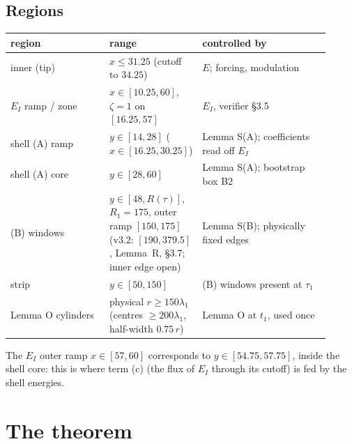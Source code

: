 \documentclass[11pt]{article}
\theoremstyle{definition}
\theoremstyle{remark}
\begin{document}
\subsection{Regions}
\begin{center}\small
\begin{tabular}{@{}p{0.31\linewidth}p{0.20\linewidth}p{0.40\linewidth}@{}}
\toprule region & range & controlled by\\\midrule
inner (tip) & $x\le31.25$ (cutoff to $34.25$) & $E$; forcing, modulation\\
$E_I$ ramp / zone & $x\in[10.25,60]$, $\zeta=1$ on $[16.25,57]$ & $E_I$, verifier \S3.5\\
shell (A) ramp & $y\in[14,28]$ ($x\in[16.25,30.25]$) & Lemma S(A); coefficients read off $E_I$\\
shell (A) core & $y\in[28,60]$ & Lemma S(A); bootstrap box B2\\
(B) windows & $y\in[48,R(\tau)]$, $R_1=175$, outer ramp $[150,175]$ (v3.2: $[190,379.5]$, Lemma~R, \S3.7; inner edge open) & Lemma S(B); physically fixed edges\\
strip & $y\in[50,150]$ & (B) windows present at $\tau_1$\\
Lemma O cylinders & physical $r\ge150\lambda_1$ (centres $\ge200\lambda_1$, half-width $0.75\,r$) & Lemma O at $t_1$, used once\\
\bottomrule\end{tabular}\end{center}
The $E_I$ outer ramp $x\in[57,60]$ corresponds to $y\in[54.75,57.75]$, inside the shell core: this is where term (c) (the flux of $E_I$ through its cutoff) is fed by the shell energies.

\section{The theorem}
\end{document}
